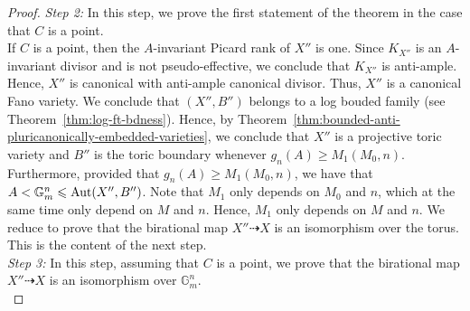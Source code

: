\documentclass{amsart}
\theoremstyle{remark}
\numberwithin{equation}{section}
\begin{document}
\begin{proof}
\textit{Step 2:} In this step, we prove the first statement of the 
theorem in the case that $C$ is a point.\\

If $C$ is a point, then the $A$-invariant Picard rank of $X''$ is one.
Since $K_{X''}$ is an $A$-invariant divisor and is not pseudo-effective, we conclude that
$K_{X''}$ is anti-ample.
Hence, $X''$ is canonical with anti-ample canonical divisor.
Thus, $X''$ is a canonical Fano variety.
We conclude that $(X'',B'')$ belongs to a log bouded family (see Theorem~\ref{thm:log-ft-bdness}).
Hence, by Theorem~\ref{thm:bounded-anti-pluricanonically-embedded-varieties}, we conclude that $X''$ is a projective toric variety and $B''$ is the toric boundary whenever $g_n(A)\geq M_1(M_0,n)$.
Furthermore, provided that $g_n(A)\geq M_1(M_0,n)$, we have that $A<\mathbb{G}_m^n\leqslant {\rm Aut}(X'',B'')$.
Note that $M_1$ only depends on $M_0$ and $n$, which at the same time only depend on $M$ and $n$. 
Hence, $M_1$ only depends on $M$ and $n$.
We reduce to prove that the 
birational map $X''\dashrightarrow X$ is an isomorphism over the torus. This is the content of the next step.\\

\textit{Step 3:} In this step, assuming that $C$ is a point, we prove that the birational map
$X''\dashrightarrow X$ is an isomorphism over $\mathbb{G}^n_m$.\\


\end{proof}
\end{document}
